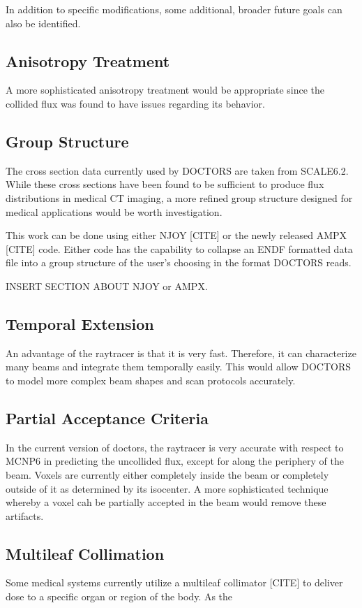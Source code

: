 In addition to specific modifications, some additional, broader future goals can also be identified.

\subsection{Anisotropy Treatment}
A more sophisticated anisotropy treatment would be appropriate since the collided flux was found to have issues regarding its behavior. 

\subsection{Group Structure}

The cross section data currently used by DOCTORS are taken from SCALE6.2. While these cross sections have been found to be sufficient to produce flux distributions in medical CT imaging, a more refined group structure designed for medical applications would be worth investigation.

This work can be done using either NJOY [CITE] or the newly released AMPX [CITE] code. Either code has the capability to collapse an ENDF formatted data file into a group structure of the user's choosing in the format DOCTORS reads.

INSERT SECTION ABOUT NJOY or AMPX.

\subsection{Temporal Extension}
An advantage of the raytracer is that it is very fast. Therefore, it can characterize many beams and integrate them temporally easily. This would allow DOCTORS to model more complex beam shapes and scan protocols accurately.

\subsection{Partial Acceptance Criteria}
In the current version of doctors, the raytracer is very accurate with respect to MCNP6 in predicting the uncollided flux, except for along the periphery of the beam. Voxels are currently either completely inside the beam or completely outside of it as determined by its isocenter. A more sophisticated technique whereby a voxel cah be partially accepted in the beam would remove these artifacts.

\subsection{Multileaf Collimation}
Some medical systems currently utilize a multileaf collimator [CITE] to deliver dose to a specific organ or region of the body. As the 

